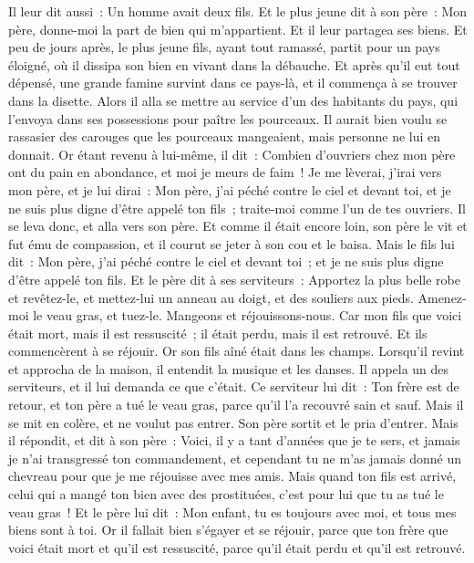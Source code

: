 \begin{multicols}{2}
Il leur dit aussi~: Un homme avait deux fils.
Et le plus jeune dit à son père~: Mon père, donne-moi la part de bien qui m'appartient. Et il leur partagea ses biens.
Et peu de jours après, le plus jeune fils, ayant tout ramassé, partit pour un pays éloigné, où il dissipa son bien en vivant dans la débauche.
Et après qu'il eut tout dépensé, une grande famine survint dans ce pays-là, et il commença à se trouver dans la disette.
Alors il alla se mettre au service d'un des habitants du pays, qui l'envoya dans ses possessions pour paître les pourceaux.
Il aurait bien voulu se rassasier des carouges que les pourceaux mangeaient, mais personne ne lui en donnait.
Or étant revenu à lui-même, il dit~: Combien d'ouvriers chez mon père ont du pain en abondance, et moi je meurs de faim~!
Je me lèverai, j'irai vers mon père, et je lui dirai~: Mon père, j'ai péché contre le ciel et devant toi,
et je ne suis plus digne d'être appelé ton fils~; traite-moi comme l'un de tes ouvriers.
Il se leva donc, et alla vers son père. Et comme il était encore loin, son père le vit et fut ému de compassion, et il courut se jeter à son cou et le baisa.
Mais le fils lui dit~: Mon père, j'ai péché contre le ciel et devant toi~; et je ne suis plus digne d'être appelé ton fils.
Et le père dit à ses serviteurs~: Apportez la plus belle robe et revêtez-le, et mettez-lui un anneau au doigt, et des souliers aux pieds.
Amenez-moi le veau gras, et tuez-le. Mangeons et réjouissons-nous.
Car mon fils que voici était mort, mais il est ressuscité~; il était perdu, mais il est retrouvé. Et ils commencèrent à se réjouir.
Or son fils aîné était dans les champs. Lorsqu'il revint et approcha de la maison, il entendit la musique et les danses.
Il appela un des serviteurs, et il lui demanda ce que c'était.
Ce serviteur lui dit~: Ton frère est de retour, et ton père a tué le veau gras, parce qu'il l'a recouvré sain et sauf.
Mais il se mit en colère, et ne voulut pas entrer. Son père sortit et le pria d'entrer.
Mais il répondit, et dit à son père~: Voici, il y a tant d'années que je te sers, et jamais je n'ai transgressé ton commandement, et cependant tu ne m'as jamais donné un chevreau pour que je me réjouisse avec mes amis.
Mais quand ton fils est arrivé, celui qui a mangé ton bien avec des prostituées, c'est pour lui que tu as tué le veau gras~!
Et le père lui dit~: Mon enfant, tu es toujours avec moi, et tous mes biens sont à toi.
Or il fallait bien s'égayer et se réjouir, parce que ton frère que voici était mort et qu'il est ressuscité, parce qu'il était perdu et qu'il est retrouvé.

\end{multicols}
